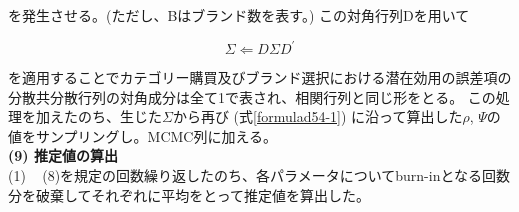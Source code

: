 \documentclass[11pt]{jsarticle}
\begin{document}
を発生させる。(ただし、Bはブランド数を表す。)
この対角行列Dを用いて

\begin{equation} \label{formula56}
\Sigma \Leftarrow D \Sigma D^{\prime}
\end{equation}

を適用することでカテゴリー購買及びブランド選択における潜在効用の誤差項の分散共分散行列の対角成分は全て1で表され、相関行列と同じ形をとる。
この処理を加えたのち、生じた$\Sigma$から再び
(式\ref{formulad54-1})
に沿って算出した$\rho$, $\Psi$の値をサンプリングし。MCMC列に加える。\\[1ex] 

{\bf (9) 推定値の算出}\\
(1) ~ (8)を規定の回数繰り返したのち、各パラメータについてburn-inとなる回数分を破棄してそれぞれに平均をとって推定値を算出した。


\newpage



\end{document}
